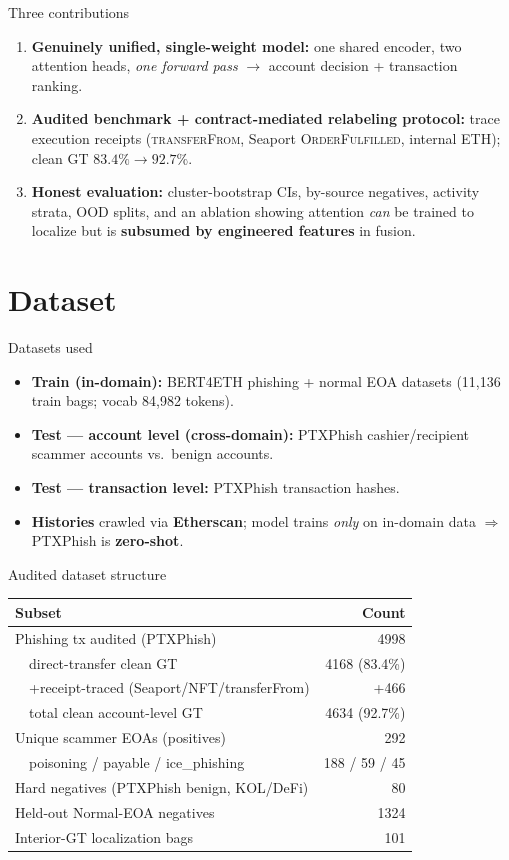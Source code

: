 \documentclass[aspectratio=169,10pt]{beamer}
\begin{document}
\begin{frame}{Three contributions}
\begin{enumerate}
\item \textbf{Genuinely unified, single-weight model:} one shared encoder, two attention heads, \emph{one forward pass} $\to$ account decision + transaction ranking.
\item \textbf{Audited benchmark + contract-mediated relabeling protocol:} trace execution receipts (\textsc{transferFrom}, Seaport \textsc{OrderFulfilled}, internal ETH); clean GT $83.4\% \to 92.7\%$.
\item \textbf{Honest evaluation:} cluster-bootstrap CIs, by-source negatives, activity strata, OOD splits, and an ablation showing attention \emph{can} be trained to localize but is \textbf{subsumed by engineered features} in fusion.
\end{enumerate}
\end{frame}

\section{Dataset}
\begin{frame}{Datasets used}
\begin{itemize}
\item \textbf{Train (in-domain):} BERT4ETH phishing + normal EOA datasets (11{,}136 train bags; vocab 84{,}982 tokens).
\item \textbf{Test --- account level (cross-domain):} PTXPhish cashier/recipient scammer accounts vs.\ benign accounts.
\item \textbf{Test --- transaction level:} PTXPhish transaction hashes.
\item \textbf{Histories} crawled via \textbf{Etherscan}; model trains \emph{only} on in-domain data $\Rightarrow$ PTXPhish is \textbf{zero-shot}.
\end{itemize}
\end{frame}

\begin{frame}{Audited dataset structure}
\centering
\begin{tabular}{lr}\toprule
\textbf{Subset} & \textbf{Count}\\\midrule
Phishing tx audited (PTXPhish) & 4998\\
\ \ direct-transfer clean GT & 4168 (83.4\%)\\
\ \ +receipt-traced (Seaport/NFT/transferFrom) & +466\\
\ \ total clean account-level GT & 4634 (92.7\%)\\
Unique scammer EOAs (positives) & 292\\
\ \ poisoning / payable / ice\_phishing & 188 / 59 / 45\\
Hard negatives (PTXPhish benign, KOL/DeFi) & 80\\
Held-out Normal-EOA negatives & 1324\\
Interior-GT localization bags & 101\\\bottomrule
\end{tabular}
\end{frame}
\end{document}

